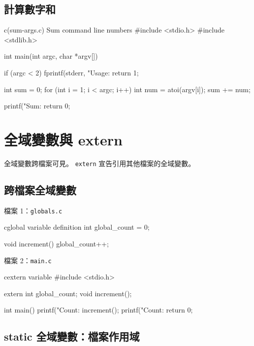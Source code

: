 \subsection*{計算數字和}

\begin{example}{c}{(sum-args.c) Sum command line numbers}
#include <stdio.h>
#include <stdlib.h>

int main(int argc, char *argv[]) {
    if (argc < 2) {
        fprintf(stderr, "Usage: %
        return 1;
    }

    int sum = 0;
    for (int i = 1; i < argc; i++) {
        int num = atoi(argv[i]);
        sum += num;
    }

    printf("Sum: %
    return 0;
}
\end{example}


\section{全域變數與 extern}

全域變數跨檔案可見。 \texttt{extern} 宣告引用其他檔案的全域變數。

\subsection*{跨檔案全域變數}

檔案 1：\texttt{globals.c}

\begin{code}{c}{global variable definition}
int global_count = 0;

void increment() {
    global_count++;
}
\end{code}

檔案 2：\texttt{main.c}

\begin{code}{c}{extern variable}
#include <stdio.h>

extern int global_count;
void increment();

int main() {
    printf("Count: %
    increment();
    printf("Count: %
    return 0;
}
\end{code}

\subsection*{static 全域變數：檔案作用域}

